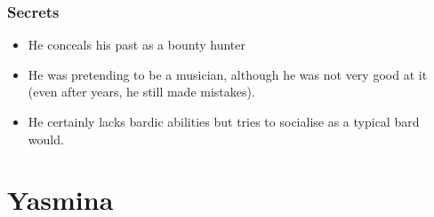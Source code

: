 \documentclass[10pt,twocolumn,twoside,openany,bg=full,layout=true,nomultitoc]{dndbook}
\begin{document}
\subsubsection{Secrets}
  \begin{itemize}
    \item He conceals his past as a bounty hunter
    \item He was pretending to be a musician, although he was not very good at it (even after years, he still made mistakes).
    \item He certainly lacks bardic abilities but tries to socialise as a typical bard would.
  \end{itemize}

\newpage


\section{Yasmina}\label{sec:yasmina}
\end{document}
